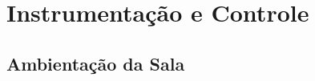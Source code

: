 %
%
%
%
%

\chapter[Instrumentação e Controle]{Instrumentação e Controle}

\section{Ambientação da Sala}
